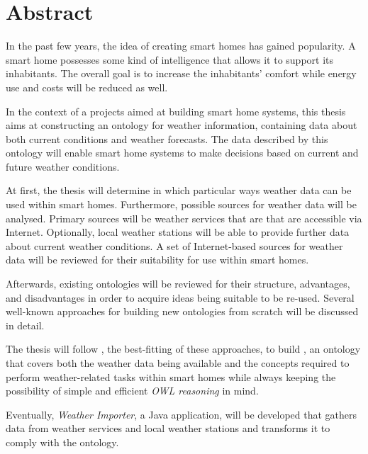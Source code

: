 \chapter*{Abstract}

In the past few years, the idea of creating smart homes has gained popularity. A smart home possesses some kind of intelligence that allows it to support its inhabitants. The overall goal is to increase the inhabitants' comfort while energy use and costs will be reduced as well.

In the context of a projects aimed at building smart home systems, this thesis aims at constructing an  ontology for weather information, containing data about both current conditions and weather forecasts. The data described by this ontology will enable smart home systems to make decisions based on current and future weather conditions.

At first, the thesis will determine in which particular ways weather data can be used within smart homes. Furthermore, possible sources for weather data will be analysed. Primary sources will be weather services that are that are accessible via Internet. Optionally, local weather stations will be able to provide further data about current weather conditions. A set of Internet-based sources for weather data will be reviewed for their suitability for use within smart homes.

Afterwards, existing ontologies will be reviewed for their structure, advantages, and disadvantages in order to acquire ideas being suitable to be re-used. Several well-known approaches for building new ontologies from scratch will be discussed in detail.

The thesis will follow \methontology, the best-fitting of these approaches, to build \smarthomeweather, an  ontology that covers both the weather data being available and the concepts required to perform weather-related tasks within smart homes while always keeping the possibility of simple and efficient \emph{\acs{OWL} reasoning} in mind.

Eventually, \emph{Weather Importer}, a Java application, will be developed that gathers data from weather services and local weather stations and transforms it to comply with the \smarthomeweather ontology.
